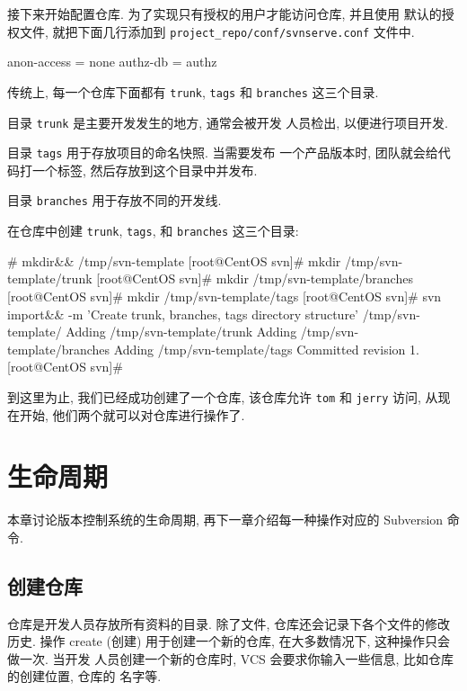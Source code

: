 \documentclass[nofonts, oneside]{ctexart}
\newcommand\svn{\texttt{svn}}
\newcommand\svnim{\texttt{import}}
\begin{document}
接下来开始配置仓库. 为了实现只有授权的用户才能访问仓库, 并且使用
默认的授权文件, 就把下面几行添加到
\texttt{project\_repo/conf/svnserve.conf}
文件中.
\begin{svnshell}
anon-access = none
authz-db = authz
\end{svnshell}

传统上, 每一个仓库下面都有 \texttt{trunk}, \texttt{tags} 和 \texttt{branches}
这三个目录.

目录 \texttt{trunk} 是主要开发发生的地方, 通常会被开发
人员检出, 以便进行项目开发.

目录 \texttt{tags} 用于存放项目的命名快照. 当需要发布
一个产品版本时, 团队就会给代码打一个标签, 然后存放到这个目录中并发布.

目录 \texttt{branches} 用于存放不同的开发线.

在仓库中创建 \texttt{trunk}, \texttt{tags}, 和 \texttt{branches}
这三个目录:
\begin{svnshell}
# mkdir&& /tmp/svn-template
[root@CentOS svn]# mkdir /tmp/svn-template/trunk
[root@CentOS svn]# mkdir /tmp/svn-template/branches
[root@CentOS svn]# mkdir /tmp/svn-template/tags
[root@CentOS svn]# svn import&\index{svn@\svn!\svnim}& -m 'Create trunk, branches, tags directory structure' /tmp/svn-template/
Adding              /tmp/svn-template/trunk
Adding              /tmp/svn-template/branches
Adding              /tmp/svn-template/tags
Committed revision 1.
[root@CentOS svn]#
\end{svnshell}

到这里为止, 我们已经成功创建了一个仓库, 该仓库允许 \texttt{tom} 和
\texttt{jerry} 访问, 从现在开始, 他们两个就可以对仓库进行操作了.

\section{生命周期}
\label{sec:life_cycle}

本章讨论版本控制系统的生命周期, 再下一章介绍每一种操作对应的 Subversion 命令.

\subsection{创建仓库}
\label{subsec:create_repository}

仓库是开发人员存放所有资料的目录. 除了文件, 仓库还会记录下各个文件的修改历史.
操作 create (创建) 用于创建一个新的仓库, 在大多数情况下, 这种操作只会做一次. 当开发
人员创建一个新的仓库时, VCS 会要求你输入一些信息, 比如仓库的创建位置, 仓库的
名字等.
\end{document}
